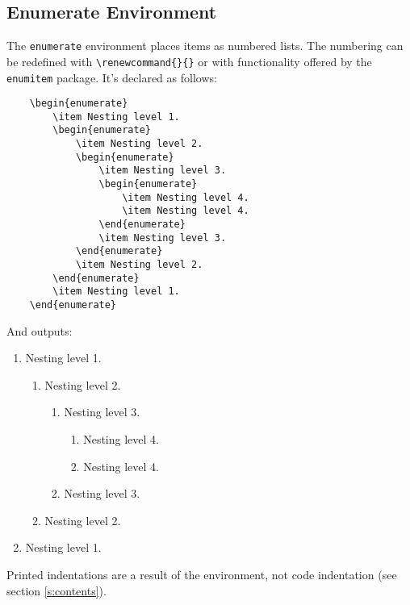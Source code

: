 \subsection{Enumerate Environment}
%
The \verb|enumerate| environment places items as numbered lists. The numbering can be redefined with \verb|\renewcommand{}{}| or with functionality offered by the \verb|enumitem| package. It's declared as follows:
\begin{verbatim}
	\begin{enumerate}
    	\item Nesting level 1.
	    \begin{enumerate}
    	    \item Nesting level 2.
        	\begin{enumerate}
            	\item Nesting level 3.
	            \begin{enumerate}
    	            \item Nesting level 4.
        	        \item Nesting level 4.
	            \end{enumerate}
    	        \item Nesting level 3.
        	\end{enumerate}
	        \item Nesting level 2.
    	\end{enumerate}
	    \item Nesting level 1.
	\end{enumerate}
\end{verbatim}
And outputs:
\begin{enumerate}
    \item Nesting level 1.
    \begin{enumerate}
        \item Nesting level 2.
        \begin{enumerate}
            \item Nesting level 3.
            \begin{enumerate}
                \item Nesting level 4.
                \item Nesting level 4.
            \end{enumerate}
            \item Nesting level 3.
        \end{enumerate}
        \item Nesting level 2.
    \end{enumerate}
    \item Nesting level 1.
\end{enumerate}
Printed indentations are a result of the environment, not code indentation (see section \ref{s:contents}).
%
